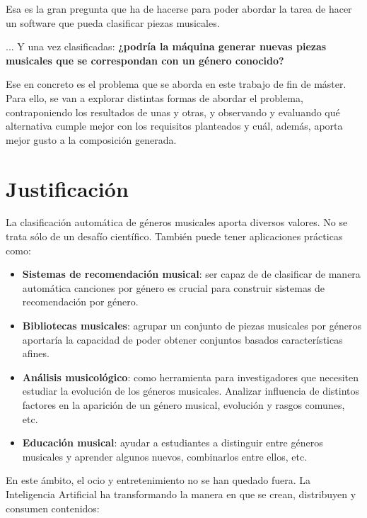 Esa es la gran pregunta que ha de hacerse para poder abordar la tarea de hacer un software que pueda clasificar piezas musicales.

... Y una vez clasificadas: \textbf{¿podría la máquina generar nuevas piezas musicales que se correspondan con un género conocido?}

Ese en concreto es el problema que se aborda en este trabajo de fin de máster. Para ello, se van a explorar distintas formas de abordar el problema, contraponiendo los resultados de unas y otras, y observando y evaluando qué alternativa cumple mejor con los requisitos planteados y cuál, además, aporta mejor gusto a la composición generada.


\section{Justificación}
La clasificación automática de géneros musicales aporta diversos valores. No se trata sólo de un desafío científico. También puede tener aplicaciones prácticas como:

\begin{itemize}
    \item \textbf{Sistemas de recomendación musical}: ser capaz de de clasificar de manera automática canciones por género es crucial para construir sistemas de recomendación por género.
    \item \textbf{Bibliotecas musicales}: agrupar un conjunto de piezas musicales por géneros aportaría la capacidad de poder obtener conjuntos basados características afines.
    \item \textbf{Análisis musicológico}: como herramienta para investigadores que necesiten estudiar la evolución de los géneros musicales. Analizar influencia de distintos factores en la aparición de un género musical, evolución y rasgos comunes, etc.
    \item \textbf{Educación musical}: ayudar a estudiantes a distinguir entre géneros musicales y aprender algunos nuevos, combinarlos entre ellos, etc.
\end{itemize}

En este ámbito, el ocio y entretenimiento no se han quedado fuera. La Inteligencia Artificial ha transformando la manera en que se crean, distribuyen y consumen contenidos:

